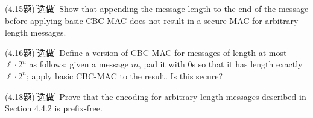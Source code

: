 \begin{questions}
        \begin{solution}
        \end{solution}

    \question (4.15题)[选做] Show that appending the message length to the end of the message before applying basic CBC-MAC does not result in a secure MAC for arbitrary-length messages.

        \begin{solution}
        \end{solution}

    \question (4.16题)[选做] Define a version of CBC-MAC for messages of length at most $\ell\cdot{2^n}$ as follows: given a message $m$, pad it with $0$s so that it has length exactly $\ell\cdot{2^n}$; apply basic CBC-MAC to the result. Is this secure?

        \begin{solution}
        \end{solution}

    \question (4.18题)[选做] Prove that the encoding for arbitrary-length messages described in Section 4.4.2 is prefix-free.

        \begin{solution}
        \end{solution}

\end{questions}



